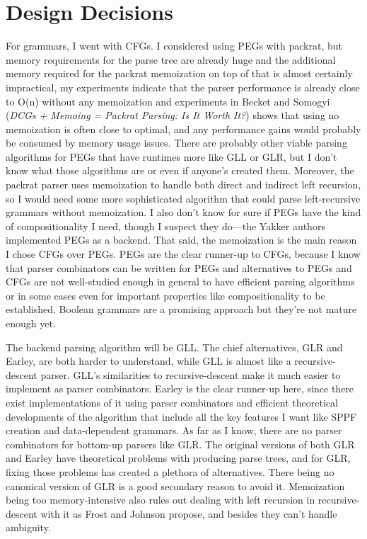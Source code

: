 \documentclass[12pt]{article}
\begin{document}
\section{Design Decisions}
\label{sec:design_decisions}

For grammars, I went with CFGs.  I considered using PEGs with packrat,
but memory requirements for the parse tree are already huge and the
additional memory required for the packrat memoization on top of that
is almost certainly impractical, my experiments indicate that the
parser performance is already close to O(n) without any memoization
and experiments in Becket and Somogyi (\emph{DCGs + Memoing = Packrat
  Parsing: Is It Worth It?}) shows that using no memoization is often
close to optimal, and any performance gains would probably be consumed
by memory usage issues.  There are probably other viable parsing
algorithms for PEGs that have runtimes more like GLL or GLR, but I
don't know what those algorithms are or even if anyone's created them.
Moreover, the packrat parser uses memoization to handle both direct
and indirect left recursion, so I would need some more sophisticated
algorithm that could parse left-recursive grammars without
memoization.  I also don't know for sure if PEGs have the kind of
compositionality I need, though I suspect they do---the Yakker authors
implemented PEGs as a backend.  That said, the memoization is the main
reason I chose CFGs over PEGs.  PEGs are the clear runner-up to CFGs,
because I know that parser combinators can be written for PEGs and
alternatives to PEGs and CFGs are not well-studied enough in general
to have efficient parsing algorithms or in some cases even for
important properties like compositionality to be established.  Boolean
grammars are a promising approach but they're not mature enough yet.

The backend parsing algorithm will be GLL.  The chief alternatives,
GLR and Earley, are both harder to understand, while GLL is almost
like a recursive-descent parser.  GLL's similarities to
recursive-descent make it much easier to implement as parser
combinators.  Earley is the clear runner-up here, since there exist
implementations of it using parser combinators and efficient
theoretical developments of the algorithm that include all the key
features I want like SPPF creation and data-dependent grammars.  As
far as I know, there are no parser combinators for bottom-up parsers
like GLR.  The original versions of both GLR and Earley have
theoretical problems with producing parse trees, and for GLR, fixing
those problems has created a plethora of alternatives.  There being no
canonical version of GLR is a good secondary reason to avoid it.
Memoization being too memory-intensive also rules out dealing with
left recursion in recursive-descent with it as Frost and Johnson
propose, and besides they can't handle ambiguity.
\end{document}
